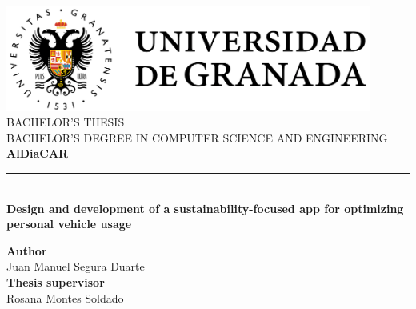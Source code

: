 \begin{titlepage}

  \newlength{\centeroffset}
  \setlength{\centeroffset}{-0.5\oddsidemargin}
  \addtolength{\centeroffset}{0.5\evensidemargin}
  \thispagestyle{empty}

  \noindent\hspace*{\centeroffset}
  \begin{minipage}{\textwidth}
    \centering

    \includegraphics[width=0.9\textwidth]{images/prefaces/ugr-full.png} \\[1em]

    \textsc{\Large BACHELOR'S THESIS} \\[0.2cm]
    \textsc{BACHELOR'S DEGREE IN COMPUTER SCIENCE AND ENGINEERING} \\[1cm]

    {\Huge\bfseries AlDiaCAR} \\

    \noindent\rule[-1ex]{\textwidth}{2pt} \\[3.5ex]

    {\large\bfseries Design and development of a sustainability-focused app for optimizing personal vehicle usage}
  \end{minipage}

  \vspace{2.5cm}
  \noindent\hspace*{\centeroffset}

  \begin{minipage}{\textwidth}
    \centering

    \textbf{Author} \\[0.1em]
    \textnormal{Juan Manuel Segura Duarte} \\[2.5ex]

    \textbf{Thesis supervisor} \\[0.1em]
    \textnormal{Rosana Montes Soldado} \\[2cm]


\end{minipage}
\end{titlepage}
